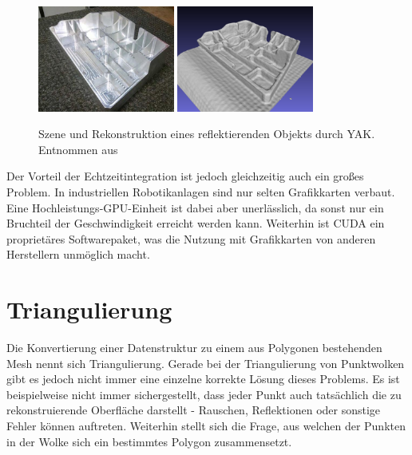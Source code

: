 \begin{figure}[ht]
	\centering
	\includegraphics[width=0.4\textwidth]{images/yak-reflecting-scene.jpg}
	\includegraphics[width=0.4\textwidth]{images/yak-reflecting-reconstruction.png}
	\caption{Szene und Rekonstruktion eines reflektierenden Objekts durch \ac{YAK}. Entnommen aus \cite{schornak2019yak}}
	\label{fig:yak-reflecting-model}
\end{figure}

Der Vorteil der Echtzeitintegration ist jedoch gleichzeitig auch ein großes Problem.
In industriellen Robotikanlagen sind nur selten Grafikkarten verbaut.
Eine Hochleistungs-GPU-Einheit ist dabei aber unerlässlich, da sonst nur ein Bruchteil der Geschwindigkeit erreicht werden kann.
Weiterhin ist CUDA ein proprietäres Softwarepaket, was die Nutzung mit Grafikkarten von anderen Herstellern unmöglich macht.



\section{Triangulierung}
\label{sec:triangulation}

Die Konvertierung einer Datenstruktur zu einem aus Polygonen bestehenden Mesh nennt sich Triangulierung.
Gerade bei der Triangulierung von Punktwolken gibt es jedoch nicht immer eine einzelne korrekte Lösung dieses Problems.
Es ist beispielweise nicht immer sichergestellt, dass jeder Punkt auch tatsächlich die zu rekonstruierende Oberfläche darstellt - Rauschen, Reflektionen oder sonstige Fehler können auftreten.
Weiterhin stellt sich die Frage, aus welchen der Punkten in der Wolke sich ein bestimmtes Polygon zusammensetzt.

